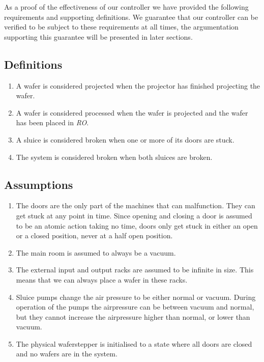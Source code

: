 \cbstart
As a proof of the effectiveness of our controller we have provided the following requirements and supporting definitions. We guarantee that our controller can be verified to be subject to these requirements at all times, the argumentation supporting this guarantee will be presented in later sections.
\cbend

\subsection{Definitions}
\begin{enumerate}
  \item A wafer is considered projected when the projector has finished projecting the wafer.
  \item A wafer is considered processed when the wafer is projected and the wafer has been placed in \textit{RO}.
  \item A sluice is considered broken when one or more of its doors are stuck.
  \item The system is considered broken when both sluices are broken.
\end{enumerate}

\subsection{Assumptions}
\begin{enumerate}
  \item The doors are the only part of the machines that can malfunction. They can get stuck at any point in time. Since opening and closing a door is assumed to be an atomic action taking no time, doors only get stuck in either an open or a closed position, never at a half open position.
  \item The main room is assumed to always be a vacuum.
  \item The external input and output racks are assumed to be infinite in size. This means that we can always place a wafer in these racks.
  \item \cbstart Sluice pumps change the air pressure to be either normal or vacuum. During operation of the pumps the airpressure can be between vacuum and normal, but they cannot increase the airpressure higher than normal, or lower than vacuum. \cbend
  \item The physical waferstepper is initialised to a state where all doors are closed and no wafers are in the system.
\end{enumerate}

